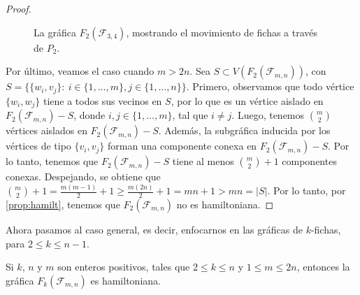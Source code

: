 \begin{proof}
\begin{figure}[ht!]
    
        \caption{La gr\'afica $F_2(\mathcal{F}_{3,4})$, mostrando el movimiento
        de fichas a trav\'es de $P_2$.}
    \label{fig:exe-tray-n-m}     
    \end{figure}

Por \'ultimo, veamos el caso cuando $m>2n$. Sea $S \subset
V(F_2(\mathcal{F}_{m,n}))$, con $S=\{\{w_i,v_j\} \colon\ i \in
\{1,\dots,m\},j\in\{1,\dots,n\}\}$. Primero, observamos que todo v\'ertice
$\{w_i,w_j\}$ tiene a todos sus vecinos en $S$, por lo que es un v\'ertice
aislado en $F_2(\mathcal{F}_{m,n})-S$, donde $i,j \in \{1,\dots,m\}$, tal que $i
\neq j$. Luego, tenemos $\binom{m}{2}$ v\'ertices aislados en
$F_2(\mathcal{F}_{m,n})-S$. Adem\'as, la subgr\'afica inducida por los
v\'ertices de tipo $\{v_i,v_j\}$ forman una componente conexa en
$F_2(\mathcal{F}_{m,n})-S$. Por lo tanto, tenemos que $F_2(\mathcal{F}_{m,n})-S$
tiene al menos $\binom{m}{2} + 1$ componentes conexas. Despejando, se obtiene
que $\binom{m}{2} + 1 = \frac{m(m-1)}{2} + 1 \geq \frac{m(2n)}{2} + 1 = mn + 1 >
mn = |S|$. Por lo tanto, por \cref{prop:hamilt}, tenemos que
$F_2(\mathcal{F}_{m,n})$ no es hamiltoniana.

\end{proof}

Ahora pasamos al caso general, es decir, enfocarnos en las gr\'aficas de
$k$-fichas, para $2 \leq k \leq n-1$.

\begin{teorema}
\label{teo:TokGenerFan}
    Si $k$, $n$ y $m$ son enteros positivos, tales que $2 \leq k \leq n$ y $1
       \leq m \leq 2n$, entonces la gr\'afica $F_k(\mathcal{F}_{m,n})$ es
       hamiltoniana.
\end{teorema}

